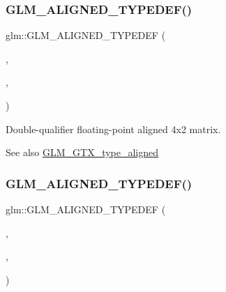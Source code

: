 \subsubsection{\texorpdfstring{G\+L\+M\+\_\+\+A\+L\+I\+G\+N\+E\+D\+\_\+\+T\+Y\+P\+E\+D\+E\+F()}{GLM\_ALIGNED\_TYPEDEF()}\hspace{0.1cm}{\footnotesize\ttfamily [202/209]}}
{\footnotesize\ttfamily glm\+::\+G\+L\+M\+\_\+\+A\+L\+I\+G\+N\+E\+D\+\_\+\+T\+Y\+P\+E\+D\+EF (\begin{DoxyParamCaption}\item[{\hyperlink{group__gtc__type__precision_ga704001c2ed5838498ff61f55995fed3a}{f64mat4x2}}]{,  }\item[{aligned\+\_\+f64mat4x2}]{,  }\item[{32}]{ }\end{DoxyParamCaption})}

Double-\/qualifier floating-\/point aligned 4x2 matrix. \begin{DoxySeeAlso}{See also}
\hyperlink{group__gtx__type__aligned}{G\+L\+M\+\_\+\+G\+T\+X\+\_\+type\+\_\+aligned} 
\end{DoxySeeAlso}
\mbox{\label{group__gtx__type__aligned_ga0892638d6ba773043b3d63d1d092622e}} 
\subsubsection{\texorpdfstring{G\+L\+M\+\_\+\+A\+L\+I\+G\+N\+E\+D\+\_\+\+T\+Y\+P\+E\+D\+E\+F()}{GLM\_ALIGNED\_TYPEDEF()}\hspace{0.1cm}{\footnotesize\ttfamily [203/209]}}
{\footnotesize\ttfamily glm\+::\+G\+L\+M\+\_\+\+A\+L\+I\+G\+N\+E\+D\+\_\+\+T\+Y\+P\+E\+D\+EF (\begin{DoxyParamCaption}\item[{\hyperlink{group__gtc__type__precision_gaf9b2bfbb2c79a39c693e2ab2bedf30e5}{f64mat4x3}}]{,  }\item[{aligned\+\_\+f64mat4x3}]{,  }\item[{32}]{ }\end{DoxyParamCaption})}

